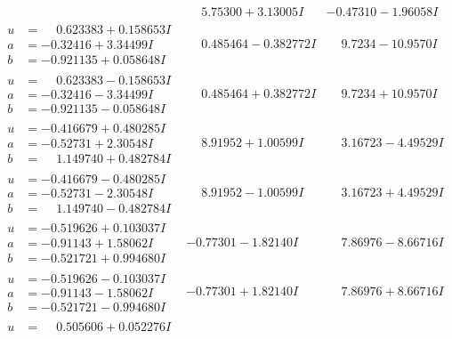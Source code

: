 \documentclass[1p]{elsarticle_modified}
\theoremstyle{definition}
\begin{document}
$$\begin{array}{c|c|c}
 & \phantom{-}5.75300 + 3.13005 I & -0.47310 - 1.96058 I \\ \hline\begin{aligned}
u &= \phantom{-}0.623383 + 0.158653 I \\
a &= -0.32416 + 3.34499 I \\
b &= -0.921135 + 0.058648 I\end{aligned}
 & \phantom{-}0.485464 - 0.382772 I & \phantom{-}9.7234 - 10.9570 I \\ \hline\begin{aligned}
u &= \phantom{-}0.623383 - 0.158653 I \\
a &= -0.32416 - 3.34499 I \\
b &= -0.921135 - 0.058648 I\end{aligned}
 & \phantom{-}0.485464 + 0.382772 I & \phantom{-}9.7234 + 10.9570 I \\ \hline\begin{aligned}
u &= -0.416679 + 0.480285 I \\
a &= -0.52731 + 2.30548 I \\
b &= \phantom{-}1.149740 + 0.482784 I\end{aligned}
 & \phantom{-}8.91952 + 1.00599 I & \phantom{-}3.16723 - 4.49529 I \\ \hline\begin{aligned}
u &= -0.416679 - 0.480285 I \\
a &= -0.52731 - 2.30548 I \\
b &= \phantom{-}1.149740 - 0.482784 I\end{aligned}
 & \phantom{-}8.91952 - 1.00599 I & \phantom{-}3.16723 + 4.49529 I \\ \hline\begin{aligned}
u &= -0.519626 + 0.103037 I \\
a &= -0.91143 + 1.58062 I \\
b &= -0.521721 + 0.994680 I\end{aligned}
 & -0.77301 - 1.82140 I & \phantom{-}7.86976 - 8.66716 I \\ \hline\begin{aligned}
u &= -0.519626 - 0.103037 I \\
a &= -0.91143 - 1.58062 I \\
b &= -0.521721 - 0.994680 I\end{aligned}
 & -0.77301 + 1.82140 I & \phantom{-}7.86976 + 8.66716 I \\ \hline\begin{aligned}
u &= \phantom{-}0.505606 + 0.052276 I \\

\end{aligned}
\end{array}$$
\end{document}
